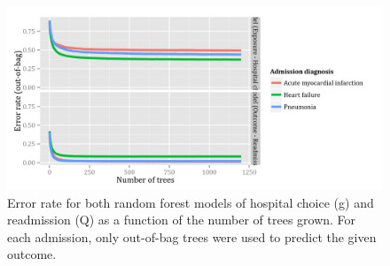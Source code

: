 \documentclass[]{article}\usepackage[]{graphicx}\usepackage[]{color}
\begin{document}
\begin{figure}[H]
    \includegraphics{../figures/error_rate_for_hospital_choice.png}
    \caption[Error rate for random forest model of hospital choice.]
      {Error rate for both random forest models of hospital choice (g) and readmission (Q) as a function of the number of trees grown. For each admission, only out-of-bag trees were used to predict the given outcome.}
    \label{fig:error_rate_for_hospital_choice}
\end{figure}

% 

\end{document}
